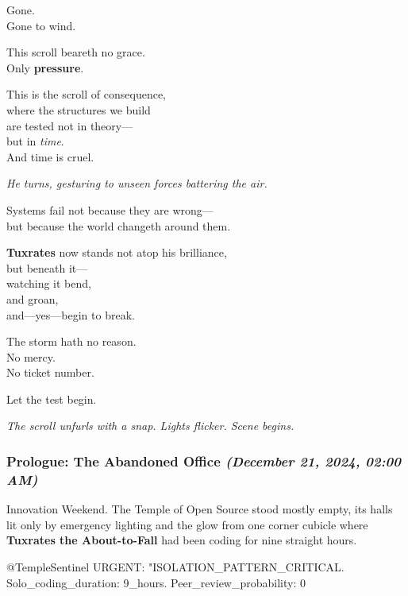 Gone.\\
Gone to wind.

This scroll beareth no grace.\\
Only \textbf{pressure}.

This is the scroll of consequence,\\
where the structures we build\\
are tested not in theory---\\
but in \emph{time}.\\
And time is cruel.

\emph{He turns, gesturing to unseen forces battering the air.}

Systems fail not because they are wrong---\\
but because the world changeth around them.

\textbf{Tuxrates} now stands not atop his brilliance,\\
but beneath it---\\
watching it bend,\\
and groan,\\
and---yes---begin to break.

The storm hath no reason.\\
No mercy.\\
No ticket number.

Let the test begin.

\emph{The scroll unfurls with a snap. Lights flicker. Scene begins.}

\bookdivider

\subsubsection{\texorpdfstring{Prologue: The Abandoned Office \emph{(December 21, 2024, 02:00 AM)}}{Prologue: The Abandoned Office (December 21, 2024, 02:00 AM)}}\label{prologue-the-abandoned-office-december-21-2024-0200-am}

Innovation Weekend. The Temple of Open Source stood mostly empty, its halls lit only by emergency lighting and the glow from one corner cubicle where \textbf{Tuxrates the About-to-Fall} had been coding for nine straight hours.

\begin{codeblock}
@TempleSentinel URGENT: "ISOLATION_PATTERN_CRITICAL. Solo_coding_duration: 9_hours. Peer_review_probability: 0%
\end{codeblock}

